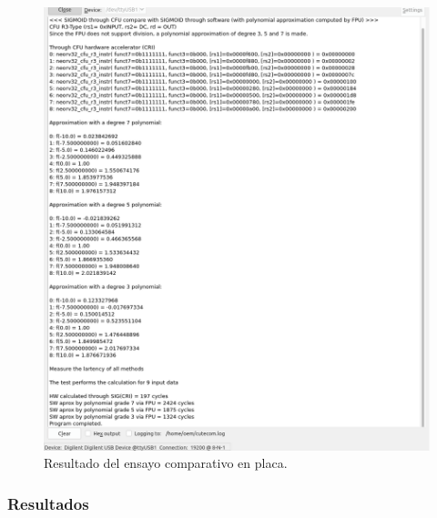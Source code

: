 \begin{figure}[H]
    \centering
    \includegraphics[width=14cm]{Figuras/RES_impl_comp.png}
    \caption{Resultado del ensayo comparativo en placa.}
    \label{fig:impl_comp}
\end{figure}

\subsubsection{Resultados}

